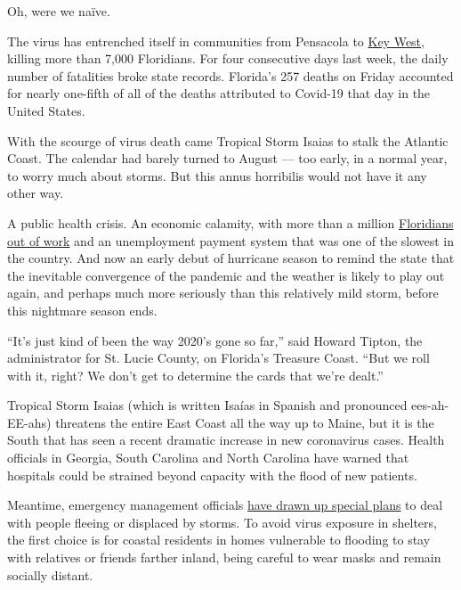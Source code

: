 Oh, were we naïve.

The virus has entrenched itself in communities from Pensacola to
\href{https://www.nytimes3xbfgragh.onion/2020/07/31/us/coronavirus-masks-enforcement-key-west.html?referringSource=articleShare}{Key
West}, killing more than 7,000 Floridians. For four consecutive days
last week, the daily number of fatalities broke state records. Florida's
257 deaths on Friday accounted for nearly one-fifth of all of the deaths
attributed to Covid-19 that day in the United States.

With the scourge of virus death came Tropical Storm Isaias to stalk the
Atlantic Coast. The calendar had barely turned to August --- too early,
in a normal year, to worry much about storms. But this annus horribilis
would not have it any other way.

A public health crisis. An economic calamity, with more than a million
\href{https://www.nytimes3xbfgragh.onion/2020/04/23/us/florida-coronavirus-unemployment.html}{Floridians
out of work} and an unemployment payment system that was one of the
slowest in the country. And now an early debut of hurricane season to
remind the state that the inevitable convergence of the pandemic and the
weather is likely to play out again, and perhaps much more seriously
than this relatively mild storm, before this nightmare season ends.

``It's just kind of been the way 2020's gone so far,'' said Howard
Tipton, the administrator for St. Lucie County, on Florida's Treasure
Coast. ``But we roll with it, right? We don't get to determine the cards
that we're dealt.''

Tropical Storm Isaias (which is written Isaías in Spanish and pronounced
ees-ah-EE-ahs) threatens the entire East Coast all the way up to Maine,
but it is the South that has seen a recent dramatic increase in new
coronavirus cases. Health officials in Georgia, South Carolina and North
Carolina have warned that hospitals could be strained beyond capacity
with the flood of new patients.

Meantime, emergency management officials
\href{https://www.nytimes3xbfgragh.onion/2020/05/24/us/hurricane-pandemic-coronavirus-florida.html}{have
drawn up special plans} to deal with people fleeing or displaced by
storms. To avoid virus exposure in shelters, the first choice is for
coastal residents in homes vulnerable to flooding to stay with relatives
or friends farther inland, being careful to wear masks and remain
socially distant.

